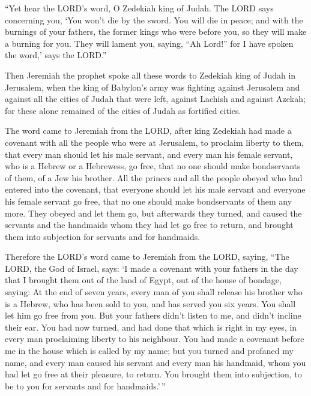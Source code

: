  ``Yet hear the LORD's word, O Zedekiah king of Judah. The
LORD says concerning you, `You won't die by the sword. 
You will die in peace; and with the burnings of your fathers, the former
kings who were before you, so they will make a burning for you. They
will lament you, saying, ``Ah Lord!'' for I have spoken the word,' says
the LORD.''

 Then Jeremiah the prophet spoke all these words to
Zedekiah king of Judah in Jerusalem,  when the king of
Babylon's army was fighting against Jerusalem and against all the cities
of Judah that were left, against Lachish and against Azekah; for these
alone remained of the cities of Judah as fortified cities.

 The word came to Jeremiah from the LORD, after king
Zedekiah had made a covenant with all the people who were at Jerusalem,
to proclaim liberty to them,  that every man should let
his male servant, and every man his female servant, who is a Hebrew or a
Hebrewess, go free, that no one should make bondservants of them, of a
Jew his brother.  All the princes and all the people
obeyed who had entered into the covenant, that everyone should let his
male servant and everyone his female servant go free, that no one should
make bondservants of them any more. They obeyed and let them go,
 but afterwards they turned, and caused the servants and
the handmaids whom they had let go free to return, and brought them into
subjection for servants and for handmaids.

 Therefore the LORD's word came to Jeremiah from the
LORD, saying,  ``The LORD, the God of Israel, says: `I
made a covenant with your fathers in the day that I brought them out of
the land of Egypt, out of the house of bondage, saying: 
At the end of seven years, every man of you shall release his brother
who is a Hebrew, who has been sold to you, and has served you six years.
You shall let him go free from you. But your fathers didn't listen to
me, and didn't incline their ear.  You had now turned,
and had done that which is right in my eyes, in every man proclaiming
liberty to his neighbour. You had made a covenant before me in the house
which is called by my name;  but you turned and profaned
my name, and every man caused his servant and every man his handmaid,
whom you had let go free at their pleasure, to return. You brought them
into subjection, to be to you for servants and for handmaids.'\,''

